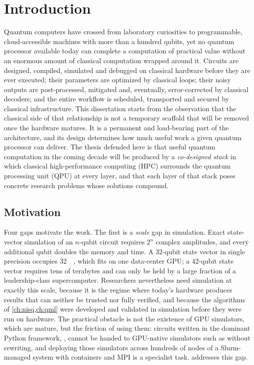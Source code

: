 \chapter{Introduction}\label{ch:intro}


Quantum computers have crossed from laboratory curiosities to programmable, cloud-accessible machines with more than a hundred qubits, yet no quantum processor available today can complete a computation of practical value without an enormous amount of classical computation wrapped around it. Circuits are designed, compiled, simulated and debugged on classical hardware before they are ever executed; their parameters are optimized by classical loops; their noisy outputs are post-processed, mitigated and, eventually, error-corrected by classical decoders; and the entire workflow is scheduled, transported and secured by classical infrastructure. This dissertation starts from the observation that the classical side of that relationship is not a temporary scaffold that will be removed once the hardware matures. It is a permanent and load-bearing part of the architecture, and its design determines how much useful work a given quantum processor can deliver. The thesis defended here is that useful quantum computation in the coming decade will be produced by a \emph{co-designed stack} in which classical high-performance computing (HPC) surrounds the quantum processing unit (QPU) at every layer, and that each layer of that stack poses concrete research problems whose solutions compound.

\section{Motivation}\label{sec:intro:motivation}

Four gaps motivate the work. The first is a \emph{scale} gap in simulation. Exact state-vector simulation of an $n$-qubit circuit requires $2^{n}$ complex amplitudes, and every additional qubit doubles the memory and time. A 32-qubit state vector in single precision occupies \SI{32}{\gibi\byte}, which fits on one data-center GPU; a 42-qubit state vector requires tens of terabytes and can only be held by a large fraction of a leadership-class supercomputer. Researchers nevertheless need simulation at exactly this scale, because it is the regime where today's hardware produces results that can neither be trusted nor fully verified, and because the algorithms of \cref{ch:nisq,ch:qml} were developed and validated in simulation before they were run on hardware. The practical obstacle is not the existence of GPU simulators, which are mature, but the friction of using them: circuits written in the dominant Python framework, \qiskit, cannot be handed to GPU-native simulators such as \cudaq{} without rewriting, and deploying those simulators across hundreds of nodes of a Slurm-managed system with containers and MPI is a specialist task.  addresses this gap.

